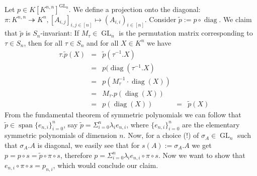 \begin{example}
  Let $p \in K[K^{n,n}]^{\operatorname{GL_n}}$.
  We define a projection onto the diagonal:
  $\pi \colon K^{n,n} \twoheadrightarrow K^n , [A_{i,j}]_{i,j \in [n]} \longmapsto (A_{i,i})_{i \in [n]} $.
  Consider $\tilde{p} := p \circ \operatorname{diag}$.
  We claim that $\tilde{p}$ is $S_n$-invariant:
  If $M_\tau \in \operatorname{GL}_n$ is the permutation matrix corresponding to $\tau \in S_n$, then for all $\tau \in S_n$ and for all $ X \in K^n$ we have
  \begin{equation}
    \begin{aligned}
      &\tau.\tilde{p} (X) &=& \tilde{p} (\tau^{-1}.X)\\
      &&=& p ( \operatorname{diag}(\tau^{-1}.X)\\
      &&=& p( M_\tau^{-1} \cdot \operatorname{diag} (X))\\
      &&=& M_\tau . p (\operatorname{diag}(X))\\
      &&=& p (\operatorname{diag}(X))&=& \tilde{p} (X)
    \end{aligned}
  \end{equation}
  From the fundamental theorem of symmetric polynomials we can follow that $\tilde{p} \in \operatorname{span}\{e_{n,i}\}_{i=0}^n$, say $\tilde{p} = \Sigma_{i=0}^n \lambda_i e_{n,i}$, where $\{ e_{n,i} \}_{i=0}^n$ are the elementary symmetric polynomials of dimension $n$.
  Now, for a choice (!) of $\sigma_A \in \operatorname{GL}_n$ such that $\sigma_A . A$ is diagonal, we easily see that for $s(A) := \sigma_A . A$ we get $p = p \circ s = \tilde{p} \circ \pi \circ s$, therefore $p = \Sigma_{i=0}^n \lambda_i e_{n,i} \circ \pi \circ s$.
  Now we want to show that $e_{n,i} \circ \pi \circ s = p_{n,i}$, which would conclude our claim.

\end{example}

